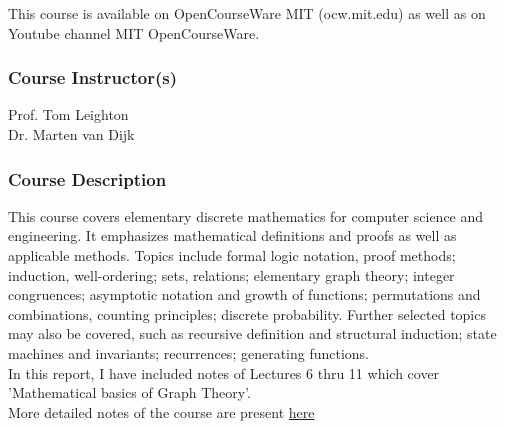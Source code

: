 \noindent
This course is available on OpenCourseWare MIT (ocw.mit.edu) as well as on Youtube channel MIT OpenCourseWare.\\
\subsubsection*{Course Instructor(s)}
Prof. Tom Leighton\\
Dr. Marten van Dijk
\subsubsection*{Course Description}
This course covers elementary discrete mathematics for computer science and engineering. It emphasizes mathematical definitions and proofs as well as applicable methods. Topics include formal logic notation, proof methods; induction, well-ordering; sets, relations; elementary graph theory; integer congruences; asymptotic notation and growth of functions; permutations and combinations, counting principles; discrete probability. Further selected topics may also be covered, such as recursive definition and structural induction; state machines and invariants; recurrences; generating functions.\\
\vspace{1cm}
In this report, I have included notes of Lectures 6 thru 11 which cover\\ 'Mathematical basics of Graph Theory'.\\
More detailed notes of the course are present \href{https://github.com/DEVANSH-DVJ/MIT-6.042J-18.062J-Fall-2010}{here}\\
